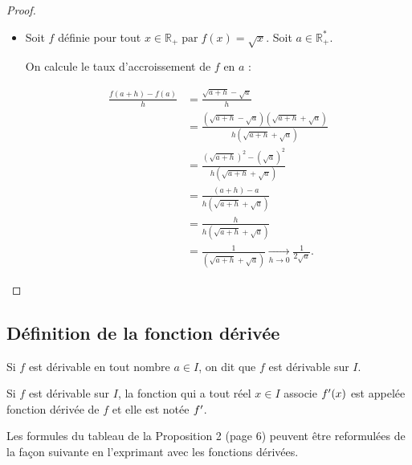 \documentclass[12pt]{article}
\theoremstyle{break}
\begin{document}
\begin{proof}
\begin{itemize}
Ainsi, $f$ est dérivable en $a$ et $f^{\prime}(a)=-\dfrac{1}{a^{2}}$.

  \item Soit $f$ définie pour tout $x \in \mathbb{R}_{+} \operatorname{par} f(x)=\sqrt{x}$. Soit $a \in \mathbb{R}_{+}^{*}$.

On calcule le taux d'accroissement de $f$ en $a$ :

$$
\begin{aligned}
\frac{f(a+h)-f(a)}{h} & =\frac{\sqrt{a+h}-\sqrt{a}}{h} \\
& =\frac{(\sqrt{a+h}-\sqrt{a})(\sqrt{a+h}+\sqrt{a})}{h(\sqrt{a+h}+\sqrt{a})} \\
& =\frac{(\sqrt{a+h})^{2}-(\sqrt{a})^{2}}{h(\sqrt{a+h}+\sqrt{a})} \\
& =\frac{(a+h)-a}{h(\sqrt{a+h}+\sqrt{a})} \\
& =\frac{h}{h(\sqrt{a+h}+\sqrt{a})} \\
& =\frac{1}{(\sqrt{a+h}+\sqrt{a})}\underset{h \rightarrow 0}{\longrightarrow} \frac{1}{2 \sqrt{a}}.
\end{aligned}
$$
\end{itemize}
\end{proof}

\subsection{Définition de la fonction dérivée}
\begin{definition}{}{}
Si $f$ est dérivable en tout nombre $a \in I$, on dit que $f$ est dérivable sur $I$.
\end{definition}

\begin{definition}{}{}
Si $f$ est dérivable sur $I$, la fonction qui a tout réel $x \in I$ associe $f^{\prime}(x)$ est appelée fonction dérivée de $f$ et elle est notée $f^{\prime}$.
\end{definition}

Les formules du tableau de la Proposition 2 (page 6) peuvent être reformulées de la façon suivante en l'exprimant avec les fonctions dérivées.
\end{document}
